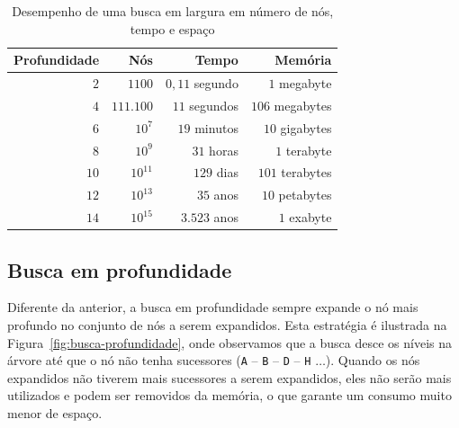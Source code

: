 \begin{table}[h]
	\centering
	\setlength{\tabcolsep}{20pt}
	\begin{tabular}{rrrr}
		\hline
		\textbf{Profundidade} & \textbf{Nós} & \textbf{Tempo} & \textbf{Memória} \\
		\hline
		$2$ & $1100$ & $0,11$ segundo & $1$ megabyte \\
		$4$ & $111.100$ & $11$ segundos & $106$ megabytes \\
		$6$ & $10^7$ & $19$ minutos & $10$ gigabytes \\
		$8$ & $10^9$ & $31$ horas & $1$ terabyte \\
		$10$ & $10^{11}$ & $129$ dias & $101$ terabytes \\
		$12$ & $10^{13}$ & $35$ anos & $10$ petabytes \\
		$14$ & $10^{15}$ & $3.523$ anos & $1$ exabyte \\
		\hline
	\end{tabular}
	
	\caption{Desempenho de uma busca em largura em número de nós, tempo e espaço}
	\label{tab:complexidade-busca-largura}
\end{table}

\subsection{Busca em profundidade}

Diferente da anterior, a busca em profundidade sempre expande o nó mais profundo no conjunto de nós a serem expandidos. Esta estratégia é ilustrada na Figura~\ref{fig:busca-profundidade}, onde observamos que a busca desce os níveis na árvore até que o nó não tenha sucessores (\texttt{A} -- \texttt{B} -- \texttt{D} -- \texttt{H} $\ldots$). Quando os nós expandidos não tiverem mais sucessores a serem expandidos, eles não serão mais utilizados e podem ser removidos da memória, o que garante um consumo muito menor de espaço.

